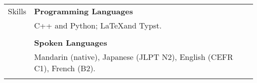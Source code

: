 \documentclass[letterpaper, 11pt]{article}
\begin{document}
\begin{center}
\begin{longtable}{p{0.76in}p{5.93in}}
        {\textcolor{OliveGreen}{Skills}} 
        & \textbf{Programming Languages}\\
        & C++ and Python; \LaTeX and Typst.\\
        & \\

        & \textbf{Spoken Languages} \\
        & Mandarin (native), Japanese (JLPT N2), English (CEFR C1), French (B2).\\
        & \\


        
        
    \end{longtable}
\end{center}
\end{document}
